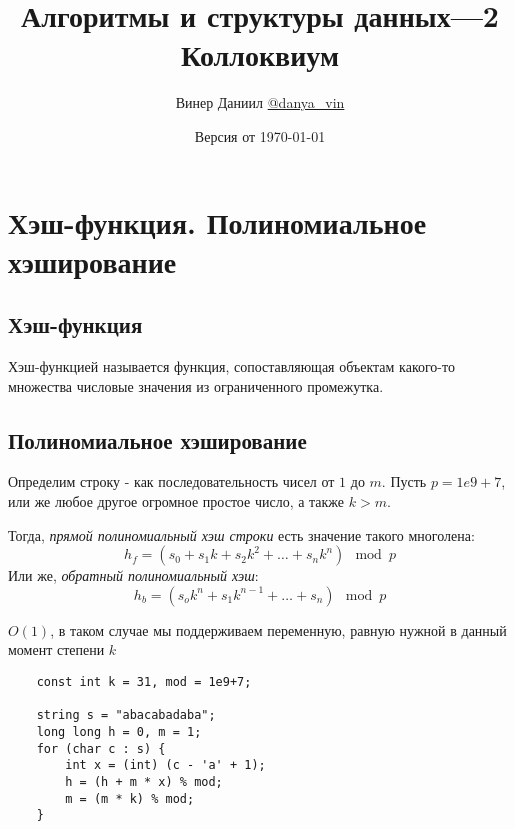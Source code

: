\documentclass[a4paper]{article}
\begin{document}
\title{\LARGE{Алгоритмы и структуры данных—2}\\ Коллоквиум}
\author{Винер Даниил \href{https://t.me/danya_vin}{@danya\_vin}}
\date{Версия от \today}
\maketitle

\tableofcontents
\newpage
\setlength{\parindent}{15pt}
\setlength{\parskip}{1.5mm} 
\section{Хэш-функция. Полиномиальное хэширование}
\subsection{Хэш-функция}
 Хэш-функцией называется функция, сопоставляющая объектам какого-то множества числовые значения из ограниченного промежутка.

\subsection{Полиномиальное хэширование}
Определим строку - как последовательность чисел от $1$ до $m$. Пусть $p=1e9+7$, или же любое другое огромное простое число, а также $k>m$.

Тогда, \textit{прямой полиномиальный хэш строки} есть значение такого многолена:
\begin{equation*}
    h_f=\left(s_0+s_1k+s_2k^2+\ldots+s_nk^n\right)\mod p
\end{equation*}
Или же, \textit{обратный полиномиальный хэш}:
\begin{equation*}
    h_b=\left(s_ok^n+s_1k^{n-1}+\ldots+s_n\right)\mod p
\end{equation*}

\difficulty $O(1)$, в таком случае мы поддерживаем переменную, равную нужной в данный момент степени $k$

\begin{lstlisting}
    const int k = 31, mod = 1e9+7;

    string s = "abacabadaba";
    long long h = 0, m = 1;
    for (char c : s) {
        int x = (int) (c - 'a' + 1);
        h = (h + m * x) % mod;
        m = (m * k) % mod;
    }

\end{lstlisting}
\end{document}
